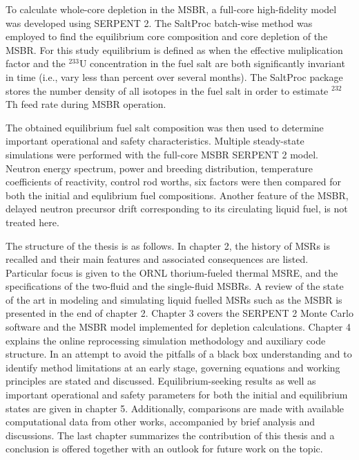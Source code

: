 To calculate whole-core depletion in the \gls{MSBR}, a full-core high-fidelity model was developed using SERPENT 2. The SaltProc batch-wise method was employed to find the equilibrium core composition and core depletion of the \gls{MSBR}. For this study equilibrium is defined as when the effective muliplication factor and the $^{233}$U concentration in the fuel salt are both significantly invariant in time (i.e., vary less than percent over several months). The SaltProc package stores the number density of all isotopes in the fuel salt in order to estimate $^{232}$Th feed rate during \gls{MSBR} operation.

The obtained equilibrium fuel salt composition was then used to determine important operational and safety characteristics. Multiple steady-state simulations were performed with the full-core \gls{MSBR} SERPENT 2 model. Neutron energy spectrum, power and breeding distribution, temperature coefficients of reactivity, control rod worths, six factors were then compared for both the initial and equlibrium fuel compositions.
Another feature of the \gls{MSBR}, delayed neutron precursor drift corresponding to its circulating liquid fuel, is not treated here.

The structure of the thesis is as follows. In chapter 2, the history of \glspl{MSR} is recalled and their main features and associated consequences are listed. Particular focus is given to the \gls{ORNL} thorium-fueled thermal \gls{MSRE}, and the specifications of the two-fluid and the single-fluid \glspl{MSBR}. A review of the state of the art in modeling and simulating liquid fuelled \glspl{MSR} such as the \gls{MSBR} is presented in the end of chapter 2. Chapter 3 covers the SERPENT 2 Monte Carlo software and the \gls{MSBR} model implemented for depletion calculations. Chapter 4 explains the online reprocessing simulation methodology and auxiliary code structure. In an attempt to avoid the pitfalls of a black box understanding and to identify method limitations at an early stage, governing equations and working principles are stated and discussed. Equilibrium-seeking results as well as important operational and safety parameters for both the initial and equilibrium states are given in chapter 5. Additionally, comparisons are made with available computational data from other works, accompanied by brief analysis and discussions. The last chapter summarizes the contribution of this thesis and a conclusion is offered together with an outlook for future work on the topic. 
